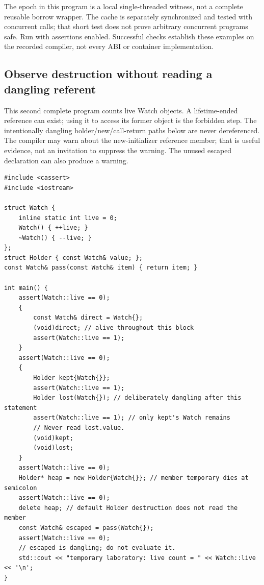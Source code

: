 The epoch in this program is a local single-threaded witness, not a complete reusable borrow wrapper. The cache is separately synchronized and tested with concurrent calls; that short test does not prove arbitrary concurrent programs safe. Run with assertions enabled. Successful checks establish these examples on the recorded compiler, not every ABI or container implementation.

\subsection{Observe destruction without reading a dangling referent}\label{01-foundations-i-ch004-observe-destruction-without-reading-a-dangling-referent}

This second complete program counts live Watch objects. A lifetime-ended reference can exist; using it to access its former object is the forbidden step. The intentionally dangling holder/new/call-return paths below are never dereferenced. The compiler may warn about the new-initializer reference member; that is useful evidence, not an invitation to suppress the warning. The unused escaped declaration can also produce a warning.

\begin{verbatim}
#include <cassert>
#include <iostream>

struct Watch {
    inline static int live = 0;
    Watch() { ++live; }
    ~Watch() { --live; }
};
struct Holder { const Watch& value; };
const Watch& pass(const Watch& item) { return item; }

int main() {
    assert(Watch::live == 0);
    {
        const Watch& direct = Watch{};
        (void)direct; // alive throughout this block
        assert(Watch::live == 1);
    }
    assert(Watch::live == 0);
    {
        Holder kept{Watch{}};
        assert(Watch::live == 1);
        Holder lost(Watch{}); // deliberately dangling after this statement
        assert(Watch::live == 1); // only kept's Watch remains
        // Never read lost.value.
        (void)kept;
        (void)lost;
    }
    assert(Watch::live == 0);
    Holder* heap = new Holder{Watch{}}; // member temporary dies at semicolon
    assert(Watch::live == 0);
    delete heap; // default Holder destruction does not read the member
    const Watch& escaped = pass(Watch{});
    assert(Watch::live == 0);
    // escaped is dangling; do not evaluate it.
    std::cout << "temporary laboratory: live count = " << Watch::live << '\n';
}
\end{verbatim}

